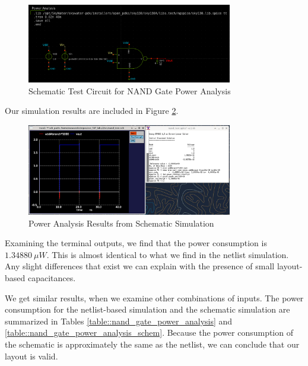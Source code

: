 \documentclass{article}
\begin{document}
	\begin{figure}[H]
		\centerline{\includegraphics[width=0.8\textwidth]{nand_power_analysis_test_circuit.png}}
		\caption{Schematic Test Circuit for NAND Gate Power Analysis}
		\label{fig::nand_power_analysis_test_circuit_schem}
	\end{figure}
	
	\noindent Our simulation results are included in Figure \ref{fig::nand_power_analysis_schem}.
	
	\begin{figure}[H]
		\centerline{\includegraphics[width=0.8\textwidth]{nand_power_analysis_schem.png}}
		\caption{Power Analysis Results from Schematic Simulation}
		\label{fig::nand_power_analysis_schem}
	\end{figure}
	
	\noindent Examining the terminal outputs, we find that the power consumption is $1.34880\ \mu{W}$. This is almost identical to what we find in the netlist simulation. Any slight differences that exist we can explain with the presence of small layout-based capacitances.
	
	We get similar results, when we examine other combinations of inputs. The power consumption for the netlist-based simulation and the schematic simulation are summarized in Tables \ref{table::nand_gate_power_analysis} and \ref{table::nand_gate_power_analysis_schem}. Because the power consumption of the schematic is approximately the same as the netlist, we can conclude that our layout is valid.
	
\end{document}
